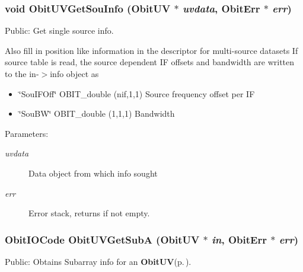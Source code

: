 \subsubsection{\setlength{\rightskip}{0pt plus 5cm}void Obit\-UVGet\-Sou\-Info ({\bf Obit\-UV} $\ast$ {\em uvdata}, {\bf Obit\-Err} $\ast$ {\em err})}\label{ObitUV_8h_a52}


Public: Get single source info. 

Also fill in position like information in the descriptor for multi-source datasets If source table is read, the source dependent IF offsets and bandwidth are written to the in-$>$info object as \begin{itemize}
\item \char`\"{}Sou\-IFOff\char`\"{} OBIT\_\-double (nif,1,1) Source frequency offset per IF \item \char`\"{}Sou\-BW\char`\"{} OBIT\_\-double (1,1,1) Bandwidth\end{itemize}
\begin{Desc}
\item[Parameters:]
\begin{description}
\item[{\em uvdata}]Data object from which info sought \item[{\em err}]Error stack, returns if not empty. \end{description}
\end{Desc}
\subsubsection{\setlength{\rightskip}{0pt plus 5cm}Obit\-IOCode Obit\-UVGet\-Sub\-A ({\bf Obit\-UV} $\ast$ {\em in}, {\bf Obit\-Err} $\ast$ {\em err})}\label{ObitUV_8h_a50}


Public: Obtains Subarray info for an {\bf Obit\-UV}{\rm (p.\,\pageref{structObitUV})}. 

